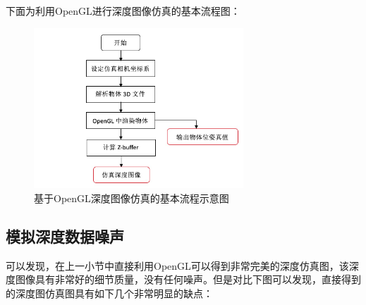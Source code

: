 下面为利用OpenGL进行深度图像仿真的基本流程图：
\begin{figure}[htb]
	\centering 
	\includegraphics[width=0.7\textwidth]{./mypic/基于OpenGL深度图像仿真的基本流程示意图.jpg} 
	\caption{基于OpenGL深度图像仿真的基本流程示意图} 
\end{figure}





\subsection{模拟深度数据噪声} %
可以发现，在上一小节中直接利用OpenGL可以得到非常完美的深度仿真图，该深度图像具有非常好的细节质量，没有任何噪声。但是对比下图可以发现，直接得到的深度图仿真图具有如下几个非常明显的缺点：

